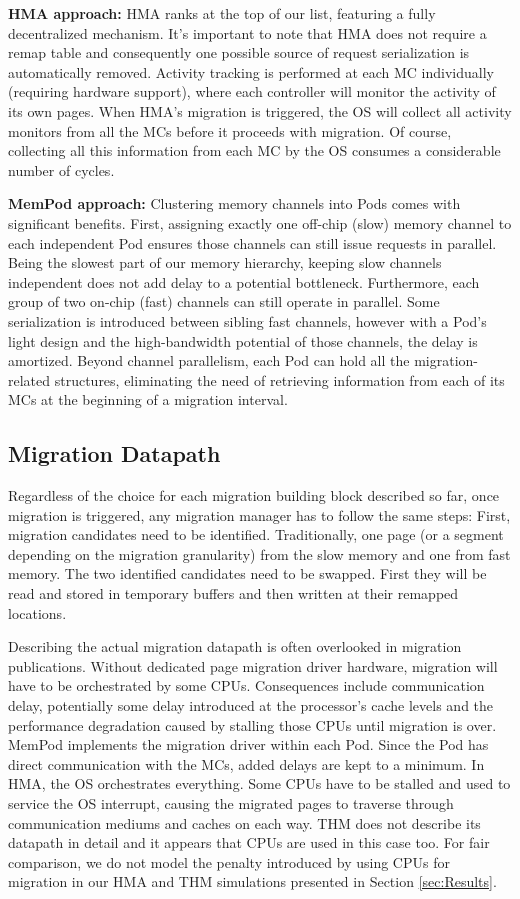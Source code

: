 	\textbf{HMA approach:} HMA ranks at the top of our list, featuring a fully decentralized mechanism. It's important to note that HMA does not require a remap table and consequently one possible source of request serialization is automatically removed. Activity tracking is performed at each MC individually (requiring hardware support), where each controller will monitor the activity of its own pages. When HMA's migration is triggered, the OS will collect all activity monitors from all the MCs before it proceeds with migration. Of course, collecting all this information from each MC by the OS consumes a considerable number of cycles.

	\textbf{MemPod approach:} Clustering memory channels into Pods comes with significant benefits. First, assigning exactly one off-chip (slow) memory channel to each independent Pod ensures those channels can still issue requests in parallel. Being the slowest part of our memory hierarchy, keeping slow channels independent does not add delay to a potential bottleneck. Furthermore, each group of two on-chip (fast) channels can still operate in parallel. Some serialization is introduced between sibling fast channels, however with a Pod's light design and the high-bandwidth potential of those channels, the delay is amortized. Beyond channel parallelism, each Pod can hold all the migration-related structures, eliminating the need of retrieving information from each of its MCs at the beginning of a migration interval.
	

\subsection{Migration Datapath}
Regardless of the choice for each migration building block described so far, once migration is triggered, any migration manager has to follow the same steps: First, migration candidates need to be identified. Traditionally, one page (or a segment depending on the migration granularity) from the slow memory and one from fast memory. The two identified candidates need to be swapped. First they will be read and stored in temporary buffers and then written at their remapped locations. 

Describing the actual migration datapath is often overlooked in migration publications. Without dedicated page migration driver hardware, migration will have to be orchestrated by some CPUs. Consequences include communication delay, potentially some delay introduced at the processor's cache levels and the performance degradation caused by stalling those CPUs until migration is over. MemPod implements the migration driver within each Pod. Since the Pod has direct communication with the MCs, added delays are kept to a minimum. In HMA, the OS orchestrates everything. Some CPUs have to be stalled and used to service the OS interrupt, causing the migrated pages to traverse through communication mediums and caches on each way. THM does not describe its datapath in detail and it appears that CPUs are used in this case too. For fair comparison, we do not model the penalty introduced by using CPUs for migration in our HMA and THM simulations presented in Section \ref{sec:Results}.

